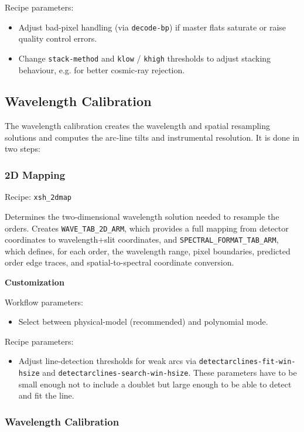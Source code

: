 Recipe parameters:
\begin{itemize}
\item Adjust bad-pixel handling (via {\tt decode-bp}) if master flats saturate or raise quality control errors.
\item Change {\tt stack-method} and {\tt klow} / {\tt khigh} thresholds to adjust stacking behaviour, e.g. for better cosmic-ray rejection.
\end{itemize}

\subsection{Wavelength Calibration}

The wavelength calibration creates the wavelength and spatial resampling solutions 
and computes the arc-line tilts and instrumental resolution.
It is done in two steps:

\subsubsection{2D Mapping}

Recipe: {\tt xsh\_2dmap}

Determines the two-dimensional wavelength solution needed to resample the orders.
Creates {\tt WAVE\_TAB\_2D\_ARM}, 
which provides a full mapping from detector coordinates to wavelength+slit coordinates, 
and {\tt SPECTRAL\_FORMAT\_TAB\_ARM},
which defines, for each order, the wavelength range, pixel boundaries, predicted order edge traces,
and spatial-to-spectral coordinate conversion.

\bigskip
{\bf Customization}
\bigskip

Workflow parameters:
\begin{itemize}
\item Select between physical-model (recommended) and polynomial mode.
\end{itemize}

Recipe parameters:
\begin{itemize}
\item Adjust line-detection thresholds for weak arcs via {\tt detectarclines-fit-win-hsize} and {\tt detectarclines-search-win-hsize}. 
These parameters have to be small enough not to include a doublet but large
enough to be able to detect and fit the line.
\end{itemize}

\subsubsection{Wavelength Calibration}

